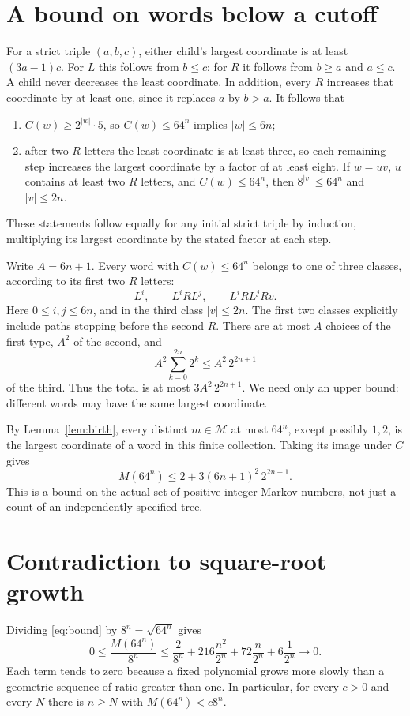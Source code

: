 \documentclass[11pt]{article}
\begin{document}
\section*{A bound on words below a cutoff}
For a strict triple $(a,b,c)$, either child's largest coordinate is at
least $(3a-1)c$. For $L$ this follows from $b\le c$; for $R$ it
follows from $b\ge a$ and $a\le c$. A child never decreases the
least coordinate. In addition, every $R$ increases that coordinate
by at least one, since it replaces $a$ by $b>a$.
It follows that
\begin{enumerate}
\item $C(w)\ge 2^{|w|}\cdot5$, so $C(w)\le64^n$ implies
$|w|\le6n$;
\item after two $R$ letters the least coordinate is at least three,
so each remaining step increases the largest coordinate by a factor
of at least eight. If $w=uv$, $u$ contains at least two $R$ letters,
and $C(w)\le64^n$, then $8^{|v|}\le64^n$ and $|v|\le2n$.
\end{enumerate}
These statements follow equally for any initial strict triple by
induction, multiplying its largest coordinate by the stated factor
at each step.

Write $A=6n+1$. Every word with $C(w)\le64^n$ belongs to one of
three classes, according to its first two $R$ letters:
\[
 L^i,\qquad L^i R L^j,\qquad L^i R L^j Rv.
\]
Here $0\le i,j\le6n$, and in the third class $|v|\le2n$.
The first two classes explicitly include paths stopping before the
second $R$. There are at most $A$ choices of the first type,
$A^2$ of the second, and
\[
 A^2\sum_{k=0}^{2n}2^k\le A^2\,2^{2n+1}
\]
of the third. Thus the total is at most
$3A^2\,2^{2n+1}$. We need only an upper bound: different words may
have the same largest coordinate.

By Lemma~\ref{lem:birth}, every distinct $m\in\mathcal M$ at most
$64^n$, except possibly $1,2$, is the largest coordinate of a word
in this finite collection. Taking its image under $C$ gives
\begin{equation}\label{eq:bound}
 M(64^n)\le2+3(6n+1)^2\,2^{2n+1}.
\end{equation}
This is a bound on the actual set of positive integer Markov numbers,
not just a count of an independently specified tree.

\section*{Contradiction to square-root growth}
Dividing \eqref{eq:bound} by $8^n=\sqrt{64^n}$ gives
\[
0\le\frac{M(64^n)}{8^n}\le
\frac{2}{8^n}+216\frac{n^2}{2^n}
+72\frac n{2^n}+6\frac1{2^n}\longrightarrow0.
\]
Each term tends to zero because a fixed polynomial grows more slowly
than a geometric sequence of ratio greater than one. In particular,
for every $c>0$ and every $N$ there is $n\ge N$ with
$M(64^n)<c8^n$.
\end{document}
